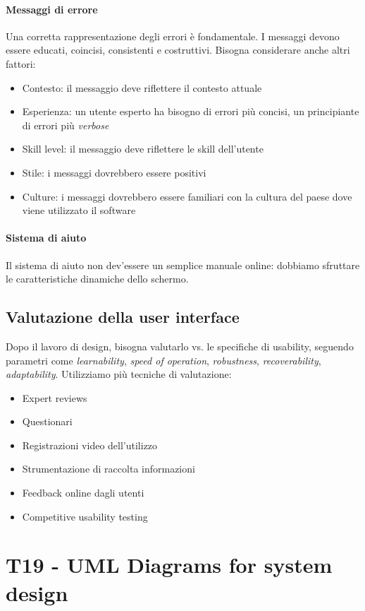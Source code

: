 \documentclass[11pt]{article}
\begin{document}
\paragraph{Messaggi di errore} Una corretta rappresentazione degli errori è fondamentale. I messaggi devono essere educati, coincisi, consistenti e costruttivi. Bisogna considerare anche altri fattori:
\begin{itemize}
    \item Contesto: il messaggio deve riflettere il contesto attuale
    \item Esperienza: un utente esperto ha bisogno di errori più concisi, un principiante di errori più \textit{verbose}
    \item Skill level: il messaggio deve riflettere le skill dell'utente
    \item Stile: i messaggi dovrebbero essere positivi 
    \item Culture: i messaggi dovrebbero essere familiari con la cultura del paese dove viene utilizzato il software
\end{itemize} 
\paragraph{Sistema di aiuto} Il sistema di aiuto non dev'essere un semplice manuale online: dobbiamo sfruttare le caratteristiche dinamiche dello schermo.
\subsection{Valutazione della user interface}
Dopo il lavoro di design, bisogna valutarlo vs. le specifiche di usability, seguendo parametri come \textit{learnability}, \textit{speed of operation}, \textit{robustness}, \textit{recoverability}, \textit{adaptability}. Utilizziamo più tecniche di valutazione:
\begin{itemize}
    \item Expert reviews 
    \item Questionari 
    \item Registrazioni video dell'utilizzo 
    \item Strumentazione di raccolta informazioni 
    \item Feedback online dagli utenti 
    \item Competitive usability testing
\end{itemize}
\section{T19 - UML Diagrams for system design}
\end{document}
